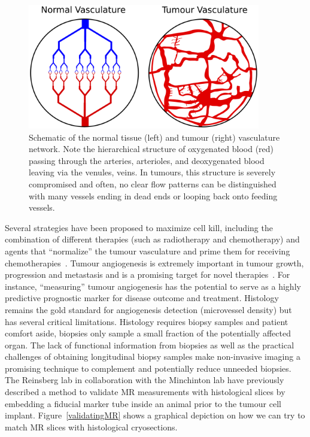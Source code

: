	\begin{figure}
		\begin{center}
		\includegraphics[width=4in]{intro/./intro-images/tumourVasculature.pdf}
		\caption{Schematic of the normal tissue (left) and tumour (right) vasculature network. Note the
		hierarchical structure of oxygenated blood (red) passing through the arteries, arterioles,
		and deoxygenated blood leaving via the venules, veins. In tumours, this structure is
		severely compromised and often, no clear flow patterns can be distinguished with many
		vessels ending in dead ends or looping back onto feeding vessels.}
		\label{tumourVasculature}
		\end{center}
	\end{figure}

	Several strategies have been proposed to maximize cell kill, including the combination of
	different therapies (such as radiotherapy and chemotherapy) and agents that ``normalize'' the
	tumour vasculature and prime them for receiving chemotherapies~\cite{Jain:2005uv}. Tumour
	angiogenesis is extremely important in tumour growth, progression and metastasis and is a
	promising target for novel therapies~\cite{Miles:2000wq}. For instance, ``measuring'' tumour
	angiogenesis has the potential to serve as a highly predictive prognostic marker for disease
	outcome and treatment. Histology remains the gold standard for angiogenesis detection
	(microvessel density) but has several critical limitations. Histology requires biopsy samples
	and patient comfort aside, biopsies only sample a small fraction of the potentially affected
	organ. The lack of functional information from biopsies as well as the practical challenges of
	obtaining longitudinal biopsy samples make non-invasive imaging a promising technique to
	complement and potentially reduce unneeded biopsies. The Reinsberg lab in collaboration with the
	Minchinton lab have previously described a method to validate MR measurements with histological
	slices by embedding a fiducial marker tube inside an animal prior to the tumour cell implant.
	Figure~\ref{validatingMR} shows a graphical depiction on how  we can try to match MR slices with
	histological cryosections.


